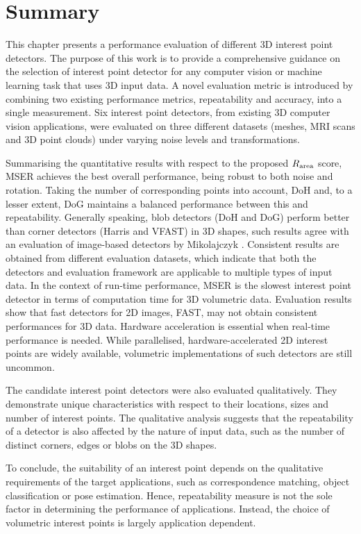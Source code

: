 


\section{Summary}
\label{sec/eval/conclusion}
This chapter presents a performance evaluation of different 3D interest point detectors.  
The purpose of this work is to provide a comprehensive guidance on the selection of interest point detector for any computer vision or machine learning task that uses 3D input data. 
A novel evaluation metric is introduced by combining two existing performance metrics, repeatability and accuracy, into a single measurement. 
Six interest point detectors, from existing 3D computer vision applications, were evaluated on three different datasets (meshes, MRI scans and 3D point clouds) under varying noise levels and transformations. 

Summarising the quantitative results with respect to the proposed $R_\textrm{area}$ score, MSER achieves the best overall performance, being robust to both noise and rotation. Taking the number of corresponding points into account, DoH and, to a lesser extent, DoG maintains a balanced performance between this and repeatability. Generally speaking, blob detectors (\eg DoH and DoG) perform better than corner detectors (\eg Harris and VFAST) in 3D shapes, such results agree with an evaluation of image-based detectors by Mikolajczyk \etal \cite{Mikolajczyk2005}. Consistent results are obtained from different evaluation datasets, which indicate that both the detectors and evaluation framework are applicable to multiple types of input data. In the context of run-time performance, MSER is the slowest interest point detector in terms of computation time for 3D volumetric data. Evaluation results show that fast detectors for 2D images, \eg FAST, may not obtain consistent performances for 3D data. Hardware acceleration is essential when real-time performance is needed. While parallelised, hardware-accelerated 2D interest points are widely available, volumetric implementations of such detectors are still uncommon. 

The candidate interest point detectors were also evaluated qualitatively. 
They demonstrate unique characteristics with respect to their locations, sizes and number of interest points. 
The qualitative analysis suggests that the repeatability of a detector is also affected by the nature of input data, such as the number of distinct corners, edges or blobs on the 3D shapes. 

To conclude, the suitability of an interest point depends on the qualitative requirements of the target applications, such as correspondence matching, object classification or pose estimation. Hence, repeatability measure is not the sole factor in determining the performance of applications. Instead, the choice of volumetric interest points is largely application dependent. 
